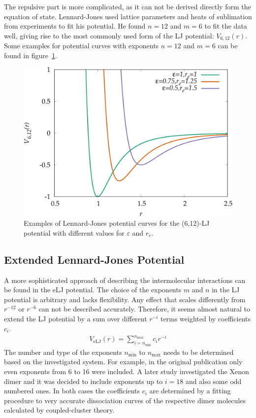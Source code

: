 The repulsive part is more complicated, as it can not be derived directly form
the equation of state. Lennard-Jones used lattice parameters and heats of
sublimation from experiments to fit his potential. He found $n=12$ and $m=6$ to
fit the data well, giving rise to the most commonly used form of the \ac{LJ}
potential: $V_{6,12}(r)$.\autocite{Lennard-Jones_Cohesion_1931} Some examples
for potential curves with exponents $n=12$ and $m=6$ can be found in
figure~\ref{fig:LJ-param}.
%
\begin{figure}[htb]
    \centering
    \includegraphics[width=.8\textwidth]{plot/LJ-param.pdf}
    \caption{Examples of Lennard-Jones potential curves for the (6,12)-\ac{LJ}
    potential with different values for $\varepsilon$ and $r_e$.}
    \label{fig:LJ-param}
\end{figure}

\subsection{Extended Lennard-Jones Potential}
\label{sec:eLJ}

A more sophisticated approach of describing the intermolecular interactions can
be found in the \acf{eLJ} potential. The choice of the exponents $m$ and $n$ in
the \ac{LJ} potential is arbitrary and lacks flexibility. Any effect that scales
differently from $r^{-12}$ or $r^{-6}$ can not be described accurately.
Therefore, it seems almost natural to extend the \ac{LJ} potential by a sum over
different $r^{-i}$ terms weighted by coefficients $c_i$.
%
\begin{align}
    V_\text{eLJ}(r)=\sum_{i=n_\text{min}}^{n_\text{max}} c_{i}r^{-i}\label{eqn:ELJ}
\end{align}
%
The number and type of the exponents $n_\text{min}$ to $n_\text{max}$ needs to
be determined based on the investigated system. For example, in the original
publication only even exponents from 6 to 16 were
included.\autocite{Schwerdtfeger_ExtensionLennardJonespotential_2006} A later
study investigated the Xenon dimer and it was decided to include exponents up to
$i=18$ and also some odd numbered
ones.\autocite{Jerabek_relativisticcoupledclusterinteraction_2017} In both cases
the coefficients $c_i$ are determined by a fitting procedure to very accurate
dissociation curves of the respective dimer molecules calculated by
coupled-cluster theory.

